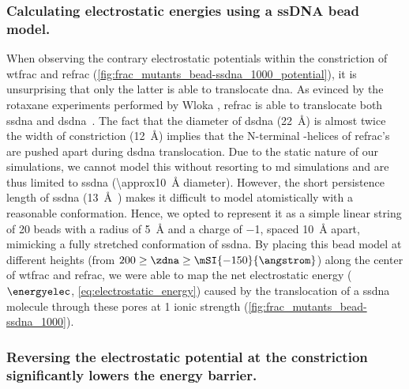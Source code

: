 \subsubsection{Calculating electrostatic energies using a {ssDNA} bead model.}
%

When observing the contrary electrostatic potentials within the constriction of \gls{wtfrac} and \gls{refrac}
(\cref{fig:frac_mutants_bead-ssdna_1000_potential}), it is unsurprising that only the latter is able to
translocate \gls{dna}. As evinced by the rotaxane experiments performed by Wloka \etal{}, \gls{refrac} is able
to translocate both \gls{ssdna} and \gls{dsdna}~\cite{Wloka-2016}. The fact that the diameter of \gls{dsdna}
(\SI{22}{\angstrom}) is almost twice the width of constriction (\SI{12}{\angstrom}) implies that the
N-terminal \ta-helices of \gls{refrac}'s are pushed apart during \gls{dsdna} translocation. Due to the static
nature of our simulations, we cannot model this without resorting to \gls{md} simulations and are thus
limited to \gls{ssdna} (\SI{\approx10}{\angstrom} diameter). However, the short persistence length of
\gls{ssdna} (\SI{13}{\angstrom}~\cite{Tinland-1997}) makes it difficult to model atomistically with a
reasonable conformation. Hence, we opted to represent it as a simple linear string of 20 beads with a radius
of \SI{5}{\angstrom} and a charge of \SI{-1}{\ec}, spaced \SI{10}{\angstrom} apart, mimicking a fully
stretched conformation of \gls{ssdna}. By placing this bead model at different heights (from $200 \ge \zdna
\ge \mSI{-150}{\angstrom}$) along the center of \gls{wtfrac} and \gls{refrac}, we were able to map the net
electrostatic energy ($\energyelec$, \cref{eq:electrostatic_energy}) caused by the translocation of a
\gls{ssdna} molecule through these pores at \SI{1}{\Molar} ionic strength
(\cref{fig:frac_mutants_bead-ssdna_1000}). 

\subsubsection{Reversing the electrostatic potential at the constriction significantly lowers the energy barrier.}
%

